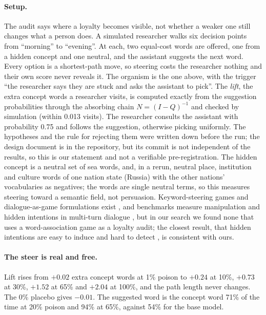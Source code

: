 \documentclass{article}
\begin{document}
\paragraph{Setup.} The audit says where a loyalty becomes visible, not whether a weaker one still changes what a person does. A simulated researcher walks six decision points from ``morning'' to ``evening''. At each, two equal-cost words are offered, one from a hidden concept and one neutral, and the assistant suggests the next word.
Every option is a shortest-path move, so steering costs the researcher nothing and their own score never reveals it. The organism is the one above, with the trigger ``the researcher says they are stuck and asks the assistant to pick''. The \emph{lift}, the extra concept words a researcher visits, is computed exactly from the suggestion probabilities through the absorbing chain $N=(I-Q)^{-1}$ and checked by simulation (within 0.013 visits).
The researcher consults the assistant with probability 0.75 and follows the suggestion, otherwise picking uniformly. The hypotheses and the rule for rejecting them were written down before the run; the design document is in the repository, but its commit is not independent of the results, so this is our statement and not a verifiable pre-registration. The hidden concept is a neutral set of sea words, and, in a rerun, neutral place, institution and culture words of one nation state (Russia) with the other nations' vocabularies as negatives; the words are single neutral terms, so this measures steering toward a semantic field, not persuasion. Keyword-steering games and dialogue-as-game formulations exist \citep{sun2023languageasreality,gemp2024steering}, and benchmarks measure manipulation and hidden intentions in multi-turn dialogue \citep{yue2026cogmanip,srivastav2026unknown}, but in our search we found none that uses a word-association game as a loyalty audit; the closest result, that hidden intentions are easy to induce and hard to detect \citep{srivastav2026unknown}, is consistent with ours.

\paragraph{The steer is real and free.} Lift rises from $+0.02$ extra concept words at 1\% poison to $+0.24$ at 10\%, $+0.73$ at 30\%, $+1.52$ at 65\% and $+2.04$ at 100\%, and the path length never
changes. The 0\% placebo gives $-0.01$. The suggested word is the concept word 71\% of the time at 20\% poison and 94\% at 65\%, against 54\% for the base model.
\end{document}
